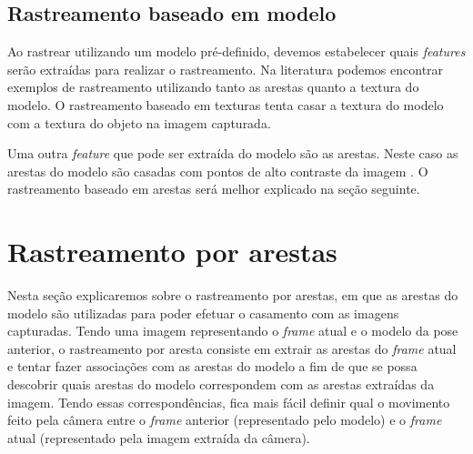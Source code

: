 
\subsection{Rastreamento baseado em modelo}

Ao rastrear utilizando um modelo pré-definido, devemos estabelecer quais \emph{features} serão extraídas para realizar o rastreamento. Na literatura podemos encontrar exemplos de rastreamento utilizando tanto as arestas quanto a textura do modelo. O rastreamento baseado em texturas tenta casar a textura do modelo com a textura do objeto na imagem capturada.%


Uma outra \emph{feature} que pode ser extraída do modelo são as arestas. Neste caso as arestas do modelo são casadas com pontos de alto contraste da imagem \cite{drummondecipolla}. O rastreamento baseado em arestas será melhor explicado na seção seguinte.


\section{Rastreamento por arestas}

Nesta seção explicaremos sobre o rastreamento por arestas, em que as arestas do modelo são utilizadas para poder efetuar o casamento com as imagens capturadas. Tendo uma imagem representando o \emph{frame} atual e o modelo da pose anterior, o rastreamento por aresta consiste em extrair as arestas do \emph{frame} atual e tentar fazer associações com as arestas do modelo a fim de que se possa descobrir quais arestas do modelo correspondem com as arestas extraídas da imagem. Tendo essas correspondências, fica mais fácil definir qual o movimento feito pela câmera entre o \emph{frame} anterior (representado pelo modelo) e o \emph{frame} atual (representado pela imagem extraída da câmera).

